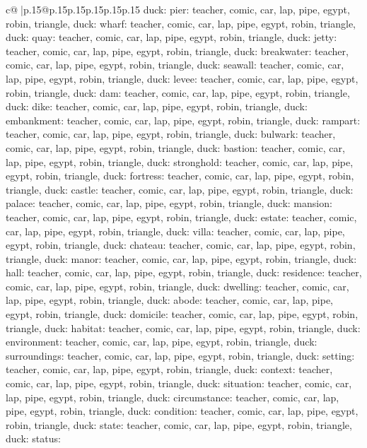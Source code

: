 \documentclass{article}
\begin{document}
{\begin{supertabular}{c@{$\;$}|p{.15\linewidth}@{}p{.15\linewidth}p{.15\linewidth}p{.15\linewidth}p{.15\linewidth}p{.15\linewidth}}
{{{duck\n\nCLUE: pier\nTARGETS: teacher, comic, car, lap, pipe, egypt, robin, triangle, duck\n\nCLUE: wharf\nTARGETS: teacher, comic, car, lap, pipe, egypt, robin, triangle, duck\n\nCLUE: quay\nTARGETS: teacher, comic, car, lap, pipe, egypt, robin, triangle, duck\n\nCLUE: jetty\nTARGETS: teacher, comic, car, lap, pipe, egypt, robin, triangle, duck\n\nCLUE: breakwater\nTARGETS: teacher, comic, car, lap, pipe, egypt, robin, triangle, duck\n\nCLUE: seawall\nTARGETS: teacher, comic, car, lap, pipe, egypt, robin, triangle, duck\n\nCLUE: levee\nTARGETS: teacher, comic, car, lap, pipe, egypt, robin, triangle, duck\n\nCLUE: dam\nTARGETS: teacher, comic, car, lap, pipe, egypt, robin, triangle, duck\n\nCLUE: dike\nTARGETS: teacher, comic, car, lap, pipe, egypt, robin, triangle, duck\n\nCLUE: embankment\nTARGETS: teacher, comic, car, lap, pipe, egypt, robin, triangle, duck\n\nCLUE: rampart\nTARGETS: teacher, comic, car, lap, pipe, egypt, robin, triangle, duck\n\nCLUE: bulwark\nTARGETS: teacher, comic, car, lap, pipe, egypt, robin, triangle, duck\n\nCLUE: bastion\nTARGETS: teacher, comic, car, lap, pipe, egypt, robin, triangle, duck\n\nCLUE: stronghold\nTARGETS: teacher, comic, car, lap, pipe, egypt, robin, triangle, duck\n\nCLUE: fortress\nTARGETS: teacher, comic, car, lap, pipe, egypt, robin, triangle, duck\n\nCLUE: castle\nTARGETS: teacher, comic, car, lap, pipe, egypt, robin, triangle, duck\n\nCLUE: palace\nTARGETS: teacher, comic, car, lap, pipe, egypt, robin, triangle, duck\n\nCLUE: mansion\nTARGETS: teacher, comic, car, lap, pipe, egypt, robin, triangle, duck\n\nCLUE: estate\nTARGETS: teacher, comic, car, lap, pipe, egypt, robin, triangle, duck\n\nCLUE: villa\nTARGETS: teacher, comic, car, lap, pipe, egypt, robin, triangle, duck\n\nCLUE: chateau\nTARGETS: teacher, comic, car, lap, pipe, egypt, robin, triangle, duck\n\nCLUE: manor\nTARGETS: teacher, comic, car, lap, pipe, egypt, robin, triangle, duck\n\nCLUE: hall\nTARGETS: teacher, comic, car, lap, pipe, egypt, robin, triangle, duck\n\nCLUE: residence\nTARGETS: teacher, comic, car, lap, pipe, egypt, robin, triangle, duck\n\nCLUE: dwelling\nTARGETS: teacher, comic, car, lap, pipe, egypt, robin, triangle, duck\n\nCLUE: abode\nTARGETS: teacher, comic, car, lap, pipe, egypt, robin, triangle, duck\n\nCLUE: domicile\nTARGETS: teacher, comic, car, lap, pipe, egypt, robin, triangle, duck\n\nCLUE: habitat\nTARGETS: teacher, comic, car, lap, pipe, egypt, robin, triangle, duck\n\nCLUE: environment\nTARGETS: teacher, comic, car, lap, pipe, egypt, robin, triangle, duck\n\nCLUE: surroundings\nTARGETS: teacher, comic, car, lap, pipe, egypt, robin, triangle, duck\n\nCLUE: setting\nTARGETS: teacher, comic, car, lap, pipe, egypt, robin, triangle, duck\n\nCLUE: context\nTARGETS: teacher, comic, car, lap, pipe, egypt, robin, triangle, duck\n\nCLUE: situation\nTARGETS: teacher, comic, car, lap, pipe, egypt, robin, triangle, duck\n\nCLUE: circumstance\nTARGETS: teacher, comic, car, lap, pipe, egypt, robin, triangle, duck\n\nCLUE: condition\nTARGETS: teacher, comic, car, lap, pipe, egypt, robin, triangle, duck\n\nCLUE: state\nTARGETS: teacher, comic, car, lap, pipe, egypt, robin, triangle, duck\n\nCLUE: status\nTARGETS: }}}
\end{supertabular}}
\end{document}
